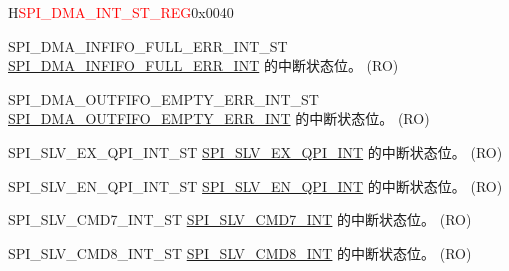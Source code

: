 \begin{register}{H}{\textcolor{red}{SPI\_DMA\_INT\_ST\_REG}}{0x{}0040}\label{regdesc:SPIDMAINTSTREG}
%
%
%
%
%
%
%
%
%
%
%
%
%
%
%
%
%
%
%
%
%
%
\regnewline%
\begin{regdesc}\begin{reglist}
\label{fielddesc:SPIDMAINFIFOFULLERRINTST}\item [SPI\_DMA\_INFIFO\_FULL\_ERR\_INT\_ST] \hyperref[int:SPIINFIFOFULLERRINT]{SPI\_DMA\_INFIFO\_FULL\_ERR\_INT} 的中断状态位。 (RO)
\label{fielddesc:SPIDMAOUTFIFOEMPTYERRINTST}\item [SPI\_DMA\_OUTFIFO\_EMPTY\_ERR\_INT\_ST] \hyperref[int:SPIOUTFIFOEMPTYERRINT]{SPI\_DMA\_OUTFIFO\_EMPTY\_ERR\_INT} 的中断状态位。 (RO)
\label{fielddesc:SPISLVEXQPIINTST}\item [SPI\_SLV\_EX\_QPI\_INT\_ST] \hyperref[int:SPISLVEXQPIINT]{SPI\_SLV\_EX\_QPI\_INT} 的中断状态位。 (RO)
\label{fielddesc:SPISLVENQPIINTST}\item [SPI\_SLV\_EN\_QPI\_INT\_ST] \hyperref[int:SPISLVENQPIINT]{SPI\_SLV\_EN\_QPI\_INT} 的中断状态位。 (RO)
\label{fielddesc:SPISLVCMD7INTST}\item [SPI\_SLV\_CMD7\_INT\_ST] \hyperref[int:SPISLVCMD7INT]{SPI\_SLV\_CMD7\_INT} 的中断状态位。 (RO)
\label{fielddesc:SPISLVCMD8INTST}\item [SPI\_SLV\_CMD8\_INT\_ST] \hyperref[int:SPISLVCMD8INT]{SPI\_SLV\_CMD8\_INT} 的中断状态位。 (RO)

\end{reglist}
\end{regdesc}
\end{register}
